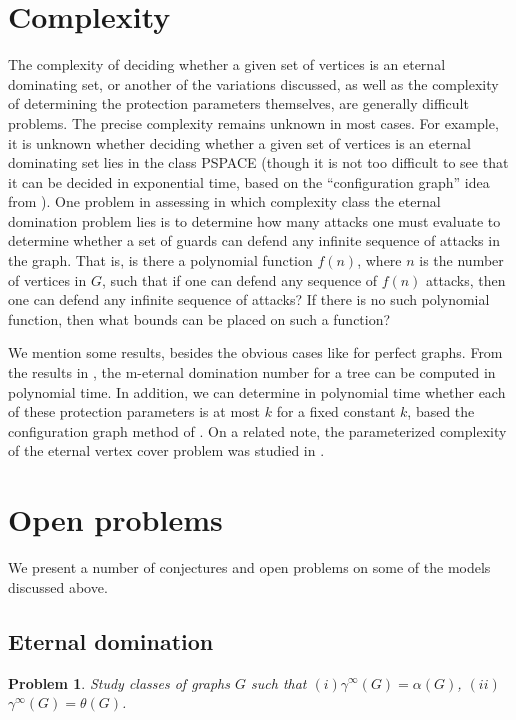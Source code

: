 \documentclass[12pt]{article}%
\newtheorem{problem}[theorem]{Problem}
\begin{document}
\section{Complexity}

The complexity of deciding whether a given set of vertices is an eternal
dominating set, or another of the variations discussed, as well as the
complexity of determining the protection parameters themselves, are generally
difficult problems. The precise complexity remains unknown in most cases. For
example, it is unknown whether deciding whether a given set of vertices is an
eternal dominating set lies in the class PSPACE (though it is not too
difficult to see that it can be decided in exponential time, based on the
``configuration graph'' idea from \cite{KLM}). One problem in assessing in
which complexity class the eternal domination problem lies is to determine how
many attacks one must evaluate to determine whether a set of guards can defend
any infinite sequence of attacks in the graph. That is, is there a polynomial
function $f(n)$, where $n$ is the number of vertices in $G$, such that if one
can defend any sequence of $f(n)$ attacks, then one can defend any infinite
sequence of attacks? If there is no such polynomial function, then what bounds
can be placed on such a function?

We mention some results, besides the obvious cases like for perfect graphs.
From the results in \cite{KM2}, the $\mathrm{m}$-eternal domination number for
a tree can be computed in polynomial time. In addition, we can determine in
polynomial time whether each of these protection parameters is at most $k$ for
a fixed constant $k$, based the configuration graph method of \cite{KLM}. On a
related note, the parameterized complexity of the eternal vertex cover problem
was studied in \cite{gaspers}.

\section{Open problems}

\label{Sec_Open}

We present a number of conjectures and open problems on some of the models
discussed above.

\subsection{Eternal domination}

\begin{problem}
Study classes of graphs $G$ such that $(i)$\hspace{0.1in}$\gamma^{\infty
}(G)=\alpha(G)$, $(ii)$\hspace{0.1in}$\gamma^{\infty}(G)=\theta(G)$.
\end{problem}
\end{document}

